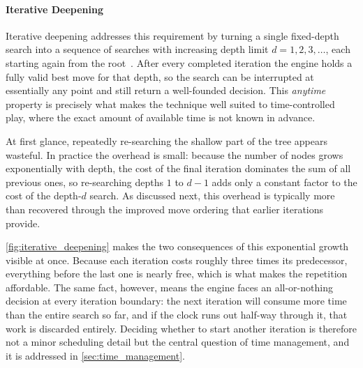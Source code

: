 \paragraph{Iterative Deepening}
Iterative deepening addresses this requirement by turning a single fixed-depth
search into a sequence of searches with increasing depth limit
$d = 1, 2, 3, \dots$, each starting again from the root~\cite{korf1985iterative}.
After every completed iteration the engine holds a fully valid best move for that
depth, so the search can be interrupted at essentially any point and still return
a well-founded decision. This \emph{anytime} property is precisely what makes the
technique well suited to time-controlled play, where the exact amount of
available time is not known in advance.

At first glance, repeatedly re-searching the shallow part of the tree appears
wasteful. In practice the overhead is small: because the number of nodes grows
exponentially with depth, the cost of the final iteration dominates the sum of
all previous ones, so re-searching depths $1$ to $d-1$ adds only a constant
factor to the cost of the depth-$d$ search. As discussed next, this overhead is
typically more than recovered through the improved move ordering that earlier
iterations provide.

\cref{fig:iterative_deepening} makes the two consequences of this exponential
growth visible at once. Because each iteration costs roughly three times its
predecessor, everything before the last one is nearly free, which is what makes
the repetition affordable. The same fact, however, means the engine faces an
all-or-nothing decision at every iteration boundary: the next iteration will
consume more time than the entire search so far, and if the clock runs out
half-way through it, that work is discarded entirely. Deciding whether to start
another iteration is therefore not a minor scheduling detail but the central
question of time management, and it is addressed in
\cref{sec:time_management}.

